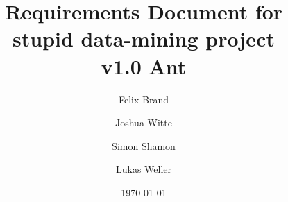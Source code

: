 \documentclass{book}
\title{Requirements Document for \\
stupid data-mining project\\v1.0 Ant}
\author{Felix Brand \and Joshua Witte \and Simon Shamon \and Lukas Weller}
\date{\today}
\begin{document}

\maketitle


\printglossaries

\tableofcontents




\end{document}
